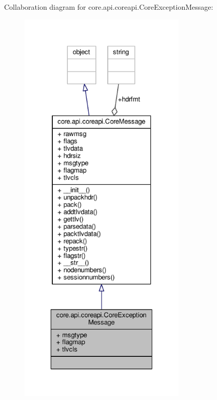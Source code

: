 Collaboration diagram for core.\+api.\+coreapi.\+Core\+Exception\+Message\+:
\nopagebreak
\begin{figure}[H]
\begin{center}
\leavevmode
\includegraphics[height=550pt]{classcore_1_1api_1_1coreapi_1_1_core_exception_message__coll__graph}
\end{center}
\end{figure}
